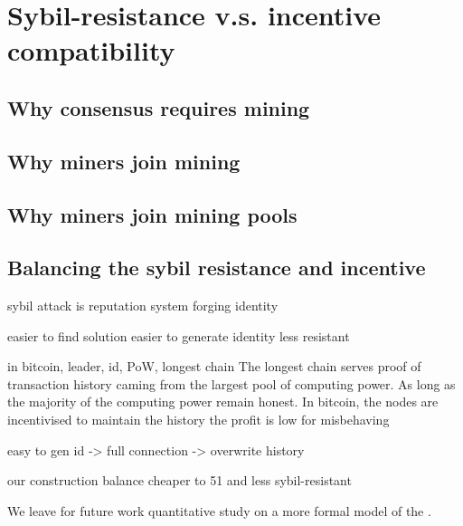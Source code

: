 \section{Sybil-resistance v.s. incentive compatibility}

\subsection{Why consensus requires mining}



\subsection{Why miners join mining}




\subsection{Why miners join mining pools}



\subsection{Balancing the sybil resistance and incentive}



sybil attack is 
reputation system
forging identity

easier to find solution
easier to generate identity
less resistant

in bitcoin, leader, id, PoW, longest chain
The longest chain serves proof of transaction history caming from the largest pool of computing power.
As long as the majority of the computing power remain honest.
In bitcoin, the nodes are incentivised to maintain the history
the profit is low for misbehaving


easy to gen id -> full connection -> overwrite history


our construction
balance
cheaper to 51 and less sybil-resistant


We leave for future work quantitative study on a more formal model of the .